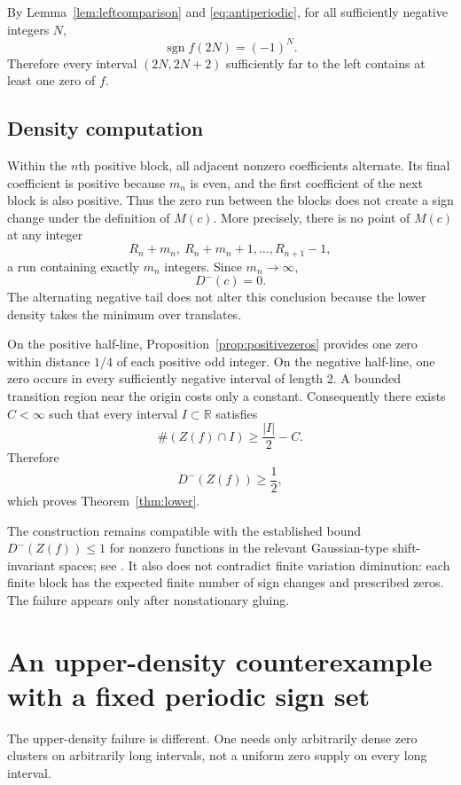 \documentclass[11pt]{article}
\newcommand{\R}{\mathbb{R}}
\newcommand{\sgn}{\operatorname{sgn}}
\begin{document}
By Lemma~\ref{lem:leftcomparison} and \eqref{eq:antiperiodic}, for all sufficiently negative integers $N$,
\[
 \sgn f(2N)=(-1)^N.
\]
Therefore every interval $(2N,2N+2)$ sufficiently far to the left contains at least one zero of $f$.

\subsection{Density computation}
Within the $n$th positive block, all adjacent nonzero coefficients alternate. Its final coefficient is positive because $m_n$ is even, and the first coefficient of the next block is also positive. Thus the zero run between the blocks does not create a sign change under the definition of $M(c)$. More precisely, there is no point of $M(c)$ at any integer
\[
 R_n+m_n,\ R_n+m_n+1,\ldots,R_{n+1}-1,
\]
a run containing exactly $m_n$ integers. Since $m_n\to\infty$,
\begin{equation}\label{eq:Dc-lower}
 \boxed{D^-(c)=0.}
\end{equation}
The alternating negative tail does not alter this conclusion because the lower density takes the minimum over translates.

On the positive half-line, Proposition~\ref{prop:positivezeros} provides one zero within distance $1/4$ of each positive odd integer. On the negative half-line, one zero occurs in every sufficiently negative interval of length $2$. A bounded transition region near the origin costs only a constant. Consequently there exists $C<\infty$ such that every interval $I\subset\R$ satisfies
\[
 \#(Z(f)\cap I)\ge\frac{|I|}{2}-C.
\]
Therefore
\begin{equation}\label{eq:Dz-lower}
 \boxed{D^-(Z(f))\ge\frac12,}
\end{equation}
which proves Theorem~\ref{thm:lower}.

The construction remains compatible with the established bound $D^-(Z(f))\le1$ for nonzero functions in the relevant Gaussian-type shift-invariant spaces; see \cite{GRS2018,GRS2020}. It also does not contradict finite variation diminution: each finite block has the expected finite number of sign changes and prescribed zeros. The failure appears only after nonstationary gluing.

\section{An upper-density counterexample with a fixed periodic sign set}
The upper-density failure is different. One needs only arbitrarily dense zero clusters on arbitrarily long intervals, not a uniform zero supply on every long interval.
\end{document}

